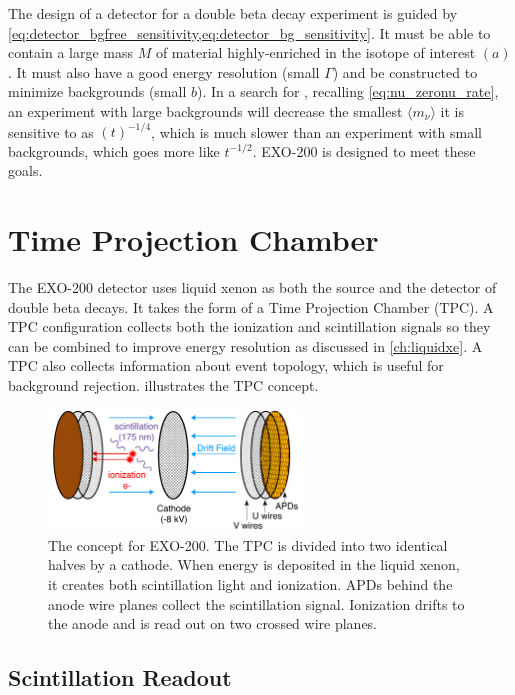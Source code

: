 \documentclass[herrin-thesis.tex]{subfiles}
\begin{document}
The design of a detector for a double beta decay experiment is guided by \cref{eq:detector_bgfree_sensitivity,eq:detector_bg_sensitivity}. It must be able to contain a large mass \(M\) of material highly-enriched in the isotope of interest \((a)\). It must also have a good energy resolution (small \(\Gamma\)) and be constructed to minimize backgrounds (small \(b\)). In a search for \zeronu{}, recalling \cref{eq:nu_zeronu_rate}, an experiment with large backgrounds will decrease the smallest  \(\langle m_{\nu} \rangle\) it is sensitive to as \((t)^{-1/4}\), which is much slower than an experiment with small backgrounds, which goes more like \(t^{-1/2}\). EXO-200 is designed to meet these goals.

\section{Time Projection Chamber}
The EXO-200 detector uses liquid xenon as both the source and the detector of double beta decays. It takes the form of a Time Projection Chamber (TPC). A TPC configuration collects both the ionization and scintillation signals so they can be combined to improve energy resolution as discussed in \cref{ch:liquidxe}. A TPC also collects information about event topology, which is useful for background rejection.  illustrates the TPC concept.
\begin{figure}
\centering
\includegraphics[width=0.6\textwidth]{./figures/detector_tpc_schematic.pdf}
\caption[A conceptual drawing of EXO-200]{The concept for EXO-200. The TPC is divided into two identical halves by a cathode. When energy is deposited in the liquid xenon, it creates both scintillation light and ionization. APDs behind the anode wire planes collect the scintillation signal. Ionization drifts to the anode and is read out on two crossed wire planes.}
\label{fig:detector_tpc_cartoon}
\end{figure}

\subsection{Scintillation Readout}
\end{document}
